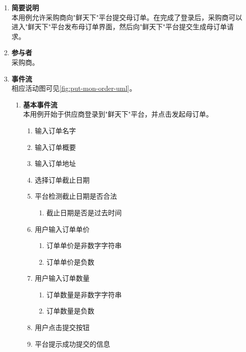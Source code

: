 \begin{enumerate}
    \item \textbf{简要说明}  \\ 本用例允许采购商向"鲜天下"平台提交母订单。在完成了登录后，采购商可以进入"鲜天下"平台发布母订单界面，然后向"鲜天下"平台提交生成母订单请求。
    \item \textbf{参与者} \\ 采购商。
    \item \textbf{事件流} \\ 相应活动图可见\autoref{fig:put-mon-order-uml}。
    \begin{enumerate} 
        \item \textbf{基本事件流} \\ 本用例开始于供应商登录到"鲜天下"平台，并点击发起母订单。
        \begin{enumerate}
            \item 输入订单名字 
            \item 输入订单概要 
            \item 输入订单地址 
            \item 选择订单截止日期 
            \item 平台检测截止日期是否合法 
            \begin{enumerate}
                \item 截止日期是否是过去时间
            \end{enumerate}

            \item 用户输入订单单价 
            \begin{enumerate}
                \item 订单单价是非数字字符串
                \item 订单单价是负数
            \end{enumerate}

            \item 用户输入订单数量 
            \begin{enumerate}
                \item 订单数量是非数字字符串
                \item 订单数量是负数
            \end{enumerate}

            \item 用户点击提交按钮
            \item 平台提示成功提交的信息

        \end{enumerate}


\end{enumerate}
\end{enumerate}

